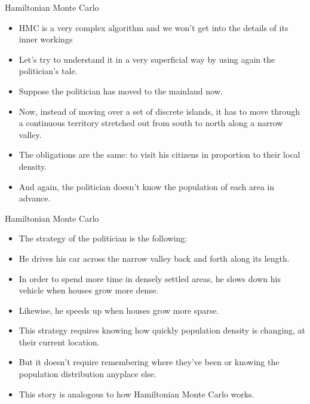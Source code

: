 \documentclass[handout]{beamer}
\begin{document}
\begin{frame}{Hamiltonian Monte Carlo}
\scriptsize{

\begin{itemize}
\item HMC is a very complex algorithm and we won't get into the details of its inner workings

\item Let's try to understand it in a very superficial way by using again the politician's tale.

\item Suppose the politician has moved to the mainland now.

\item Now, instead of moving over a set of discrete islands, it has to move through a continuous territory stretched out from south to north along a narrow valley.

\item The obligations are the same: to visit his citizens in proportion to their local density.

\item And again, the politician doesn't know the population of each area in advance.

\end{itemize}


} 
\end{frame}


\begin{frame}{Hamiltonian Monte Carlo}
\scriptsize{

\begin{itemize}
\item The strategy of the politician is the following:

\item He drives his car across the narrow valley back and forth along its length.

\item In order to spend more time in densely settled areas, he slows down his  vehicle when houses grow
more dense. 
\item Likewise, he speeds up when houses grow more sparse. 
\item This strategy requires knowing how quickly population density is changing, at their current location. 

\item But it doesn't require remembering where they've been or knowing the population distribution anyplace else.

\item This story is analogous to how Hamiltonian Monte Carlo works.

\end{itemize}


} 
\end{frame}
\end{document}
